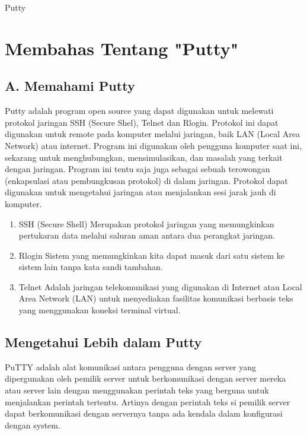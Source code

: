 
Putty

\section {Membahas Tentang "Putty"}

\subsection {A. Memahami Putty}

Putty adalah program open source yang dapat digunakan untuk melewati protokol jaringan SSH (Secure Shel), Telnet dan Rlogin. Protokol ini dapat digunakan untuk remote pada komputer melalui jaringan, baik LAN (Local Area Network) atau internet. Program ini digunakan oleh pengguna komputer saat ini, sekarang untuk menghubungkan, mensimulasikan, dan masalah yang terkait dengan jaringan. Program ini tentu saja juga sebagai sebuah terowongan (enkapsulasi atau pembungkusan protokol) di dalam jaringan.
Protokol dapat digunakan untuk mengetahui jaringan atau menjalankan sesi jarak jauh di komputer.

\begin{enumerate}

	\item SSH (Secure Shell)
	Merupakan protokol jaringan yang memungkinkan pertukaran data melalui saluran aman antara dua perangkat jaringan.

	\item Rlogin
	Sistem yang memungkinkan kita dapat masuk dari satu sistem ke sistem lain tanpa kata sandi tambahan.

	\item Telnet
	Adalah jaringan telekomunikasi yang digunakan di Internet atau Local Area Network (LAN) untuk menyediakan fasilitas komunikasi berbasis teks yang menggunakan koneksi terminal virtual.

\end{enumerate}


\subsection {Mengetahui Lebih dalam Putty}

PuTTY adalah alat komunikasi antara pengguna dengan server yang dipergunakan oleh pemilik server untuk berkomunikasi dengan server mereka atau server lain dengan menggunakan perintah teks yang berguna untuk menjalankan perintah tertentu. Artinya dengan perintah teks si pemilik server dapat berkomunikasi dengan servernya tanpa ada kendala dalam konfigurasi dengan system.

